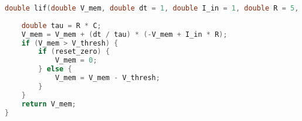 \begin{lstlisting}[language=C++, caption={Implementação em C++ da simulação completa do potencial de ação de um LIF: $I_{in}=1$, $V_{thresh} = 2$ is threshold}, label={lst:membranepotentialfull}]
double lif(double V_mem, double dt = 1, double I_in = 1, double R = 5, double C = 1, double V_thresh = 2, bool reset_zero = true) {
	
	double tau = R * C;
	V_mem = V_mem + (dt / tau) * (-V_mem + I_in * R);
	if (V_mem > V_thresh) {
		if (reset_zero) {
			V_mem = 0;
		} else {
			V_mem = V_mem - V_thresh;
		}
	}
	return V_mem;
}
\end{lstlisting}
